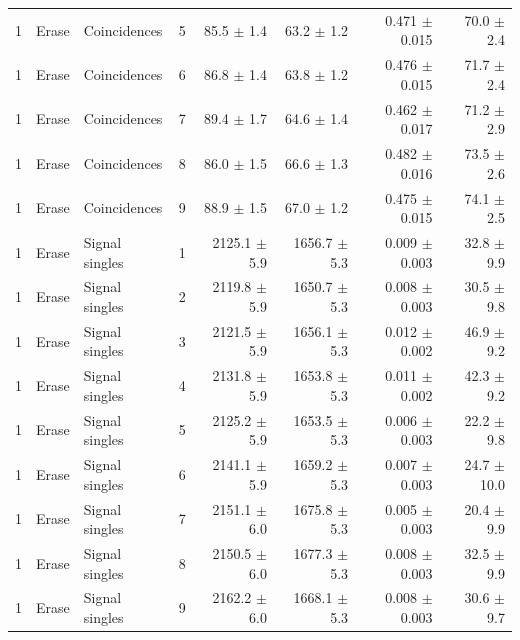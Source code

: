 \begin{tabular}{llllrrrr}
1 & Erase & Coincidences & 5 & 85.5 \ensuremath{\pm} 1.4 & 63.2 \ensuremath{\pm} 1.2 & 0.471 \ensuremath{\pm} 0.015 & 70.0 \ensuremath{\pm} 2.4 \\
1 & Erase & Coincidences & 6 & 86.8 \ensuremath{\pm} 1.4 & 63.8 \ensuremath{\pm} 1.2 & 0.476 \ensuremath{\pm} 0.015 & 71.7 \ensuremath{\pm} 2.4 \\
1 & Erase & Coincidences & 7 & 89.4 \ensuremath{\pm} 1.7 & 64.6 \ensuremath{\pm} 1.4 & 0.462 \ensuremath{\pm} 0.017 & 71.2 \ensuremath{\pm} 2.9 \\
1 & Erase & Coincidences & 8 & 86.0 \ensuremath{\pm} 1.5 & 66.6 \ensuremath{\pm} 1.3 & 0.482 \ensuremath{\pm} 0.016 & 73.5 \ensuremath{\pm} 2.6 \\
1 & Erase & Coincidences & 9 & 88.9 \ensuremath{\pm} 1.5 & 67.0 \ensuremath{\pm} 1.2 & 0.475 \ensuremath{\pm} 0.015 & 74.1 \ensuremath{\pm} 2.5 \\
\midrule
1 & Erase & Signal singles & 1 & 2125.1 \ensuremath{\pm} 5.9 & 1656.7 \ensuremath{\pm} 5.3 & 0.009 \ensuremath{\pm} 0.003 & 32.8 \ensuremath{\pm} 9.9 \\
1 & Erase & Signal singles & 2 & 2119.8 \ensuremath{\pm} 5.9 & 1650.7 \ensuremath{\pm} 5.3 & 0.008 \ensuremath{\pm} 0.003 & 30.5 \ensuremath{\pm} 9.8 \\
1 & Erase & Signal singles & 3 & 2121.5 \ensuremath{\pm} 5.9 & 1656.1 \ensuremath{\pm} 5.3 & 0.012 \ensuremath{\pm} 0.002 & 46.9 \ensuremath{\pm} 9.2 \\
1 & Erase & Signal singles & 4 & 2131.8 \ensuremath{\pm} 5.9 & 1653.8 \ensuremath{\pm} 5.3 & 0.011 \ensuremath{\pm} 0.002 & 42.3 \ensuremath{\pm} 9.2 \\
1 & Erase & Signal singles & 5 & 2125.2 \ensuremath{\pm} 5.9 & 1653.5 \ensuremath{\pm} 5.3 & 0.006 \ensuremath{\pm} 0.003 & 22.2 \ensuremath{\pm} 9.8 \\
1 & Erase & Signal singles & 6 & 2141.1 \ensuremath{\pm} 5.9 & 1659.2 \ensuremath{\pm} 5.3 & 0.007 \ensuremath{\pm} 0.003 & 24.7 \ensuremath{\pm} 10.0 \\
1 & Erase & Signal singles & 7 & 2151.1 \ensuremath{\pm} 6.0 & 1675.8 \ensuremath{\pm} 5.3 & 0.005 \ensuremath{\pm} 0.003 & 20.4 \ensuremath{\pm} 9.9 \\
1 & Erase & Signal singles & 8 & 2150.5 \ensuremath{\pm} 6.0 & 1677.3 \ensuremath{\pm} 5.3 & 0.008 \ensuremath{\pm} 0.003 & 32.5 \ensuremath{\pm} 9.9 \\
1 & Erase & Signal singles & 9 & 2162.2 \ensuremath{\pm} 6.0 & 1668.1 \ensuremath{\pm} 5.3 & 0.008 \ensuremath{\pm} 0.003 & 30.6 \ensuremath{\pm} 9.7 \\
\bottomrule
\end{tabular}
